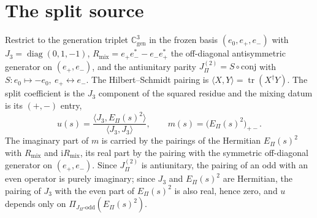 \documentclass[11pt]{article}
\theoremstyle{definition}
\theoremstyle{remark}
\newcommand{\JPi}{J_{\Pi}}
\newcommand{\Jthree}{J_{3}}
\newcommand{\Rmix}{R_{\mathrm{mix}}}
\newcommand{\Cgen}{\mathbb{C}^{3}_{\mathrm{gen}}}
\newcommand{\Epi}{E_{\Pi}}
\newcommand{\tr}{\operatorname{tr}}
\newcommand{\diag}{\operatorname{diag}}
\newcommand{\Podd}{\Pi_{\JPi\text{-odd}}}
\begin{document}
  \section{The split source}
    \label{sec:source}

    Restrict to the generation triplet $\Cgen$ in the frozen basis $(e_0, e_+, e_-)$ with
    $\Jthree = \diag(0, 1, -1)$, $\Rmix = e_+ e_-^{*} - e_- e_+^{*}$ the off-diagonal antisymmetric generator on
    $(e_+, e_-)$, and the antiunitary
    parity $\JPi^{(2)} = S \circ \mathrm{conj}$ with $S : e_0 \mapsto -e_0,\ e_+ \leftrightarrow e_-$.
    The Hilbert--Schmidt pairing is $\langle X, Y\rangle = \tr(X^{\dagger} Y)$.
    The split coefficient is the $\Jthree$ component of the squared residue and the mixing datum is its $(+,-)$ entry,
    \begin{equation}
      \label{eq:uv}
      u(s) = \frac{\langle \Jthree, \Epi(s)^2\rangle}{\langle \Jthree, \Jthree\rangle},
      \qquad
      m(s) = \bigl(\Epi(s)^2\bigr)_{+-}.
    \end{equation}
    The imaginary part of $m$ is carried by the pairings of the Hermitian $\Epi(s)^2$ with $\Rmix$ and
    $\mathrm{i}\Rmix$,
    its real part by the pairing with the symmetric off-diagonal generator on $(e_+, e_-)$.
    Since $\JPi^{(2)}$ is antiunitary, the pairing of an odd with an even operator is purely imaginary; since $\Jthree$
    and $\Epi(s)^2$ are Hermitian, the pairing of $\Jthree$ with the even part of $\Epi(s)^2$ is also real, hence zero,
    and $u$ depends only on $\Podd(\Epi(s)^2)$.
\end{document}
